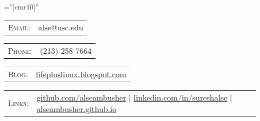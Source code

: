 \documentclass{article} %
\begin{document}
\pagestyle{empty} %

\font\fb=''[cmr10]'' %

{\par} %
\begin{tabular}{rl}
\textsc{Email:} & alse@usc.edu\\
\end{tabular}
\hfill
\begin{tabular}{rl}
\textsc{\hspace{2.0cm}Phone:} & (213) 258-7664\\
\end{tabular}
\hfill
\begin{tabular}{rl}
\textsc{Blog:} & \href{lifepluslinux.blogspot.com}{lifepluslinux.blogspot.com}\\
\end{tabular}
%
\begin{tabular}{rl}
\textsc{Links:} & \href{http://github.com/alseambusher}{github.com/alseambusher} \hspace{.5cm}|\hspace{.5cm} \href{http://linkedin.com/in/sureshalse}{linkedin.com/in/sureshalse} \hspace{.5cm}|\hspace{.3cm} \href{alseambusher.github.io}{alseambusher.github.io} 
\end{tabular}
 
\end{document}
